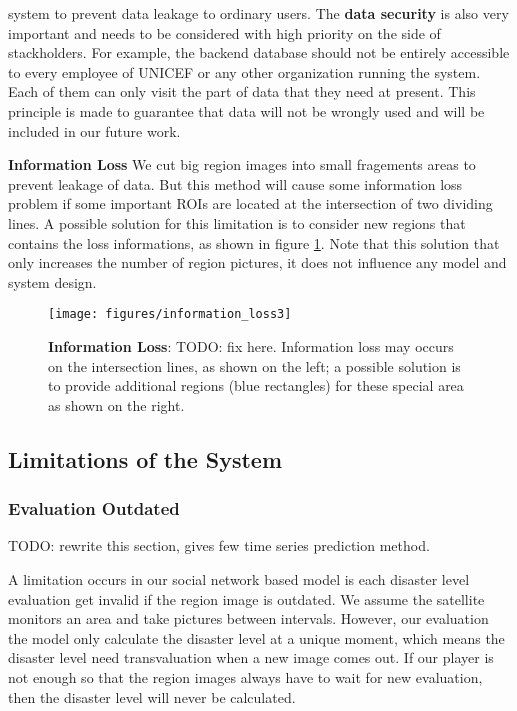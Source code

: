 system to prevent data leakage to ordinary users. 
The \textbf{data security} is also very important and needs to be considered with high priority on the side of stackholders. For example, 
the backend database should not be entirely accessible to every employee of UNICEF or any other organization running the system.
Each of them can only visit the part of data that they need at present. This principle is made to guarantee 
that data will not be wrongly used and will be included in our future work.

\textbf{Information Loss}
We cut big region images into small fragements areas to prevent leakage of data. 
But this method will cause some information loss problem if some important ROIs are 
located at the intersection of two dividing lines.
A possible solution for this limitation is to consider new regions that contains the loss
informations, as shown in figure \ref{fig:information_loss}. Note that this solution that
only increases the number of region pictures, it does not influence any model and system design.


\begin{figure}[H]
\centering
\texttt{[image: figures/information\_loss3]}
\caption{\textbf{Information Loss}: TODO: fix here. Information loss may occurs on the intersection lines, as shown on the left; a possible solution
is to provide additional regions (blue rectangles) for these special area as shown on the right.}
\label{fig:information_loss}
\end{figure}

\subsection{Limitations of the System}

\subsubsection{Evaluation Outdated}

TODO: rewrite this section, gives few time series prediction method.

A limitation occurs in our social network based model is each disaster level evaluation get invalid 
if the region image is outdated. 
We assume the satellite monitors an area and take pictures between intervals. However, our evaluation
the model only calculate the disaster level at a unique moment, which means the disaster level need 
transvaluation when a new image comes out.
If our player is not enough so that the region images always have to wait for new evaluation, then the
disaster level will never be calculated.

